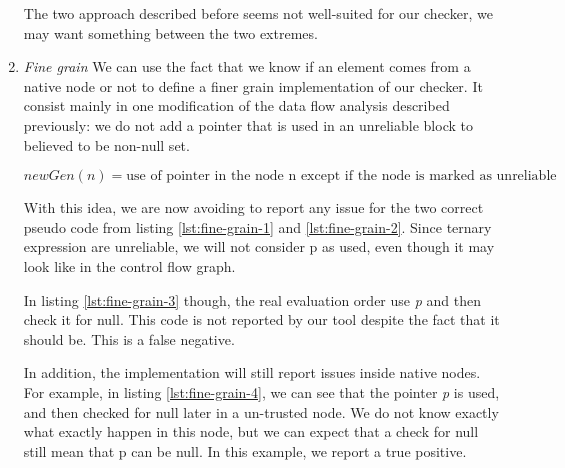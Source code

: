 \begin{enumerate}
The two approach described before seems not well-suited for our checker, we may want something between the two extremes.

\item \textit{Fine grain} \newline
We can use the fact that we know if an element comes from a native node or not to define a finer grain implementation of our checker. 
It consist mainly in one modification of the data flow analysis described previously: we do not add a pointer that is used in an unreliable block to believed to be non-null set.

\begin{equation}\label{eqn:dataflow4}
newGen(n) = \text{use of pointer in the node n except if the node is marked as unreliable}
\end{equation}





With this idea, we are now avoiding to report any issue for the two correct pseudo code from listing \ref{lst:fine-grain-1} and \ref{lst:fine-grain-2}. Since ternary expression are unreliable, we will not consider p as used, even though it may look like in the control flow graph.



In listing \ref{lst:fine-grain-3} though, the real evaluation order use \emph{p} and then check it for null. This code is not reported by our tool despite the fact that it should be. This is a false negative.\newline



In addition, the implementation will  still report issues inside native nodes.
For example, in listing \ref{lst:fine-grain-4}, we can see that the pointer \emph{p} is used, and then checked for null later in a un-trusted node. We do not know exactly what exactly happen in this node, but we can expect that a check for null still mean that p can be null. 
In this example, we report a true positive.
\end{enumerate}

